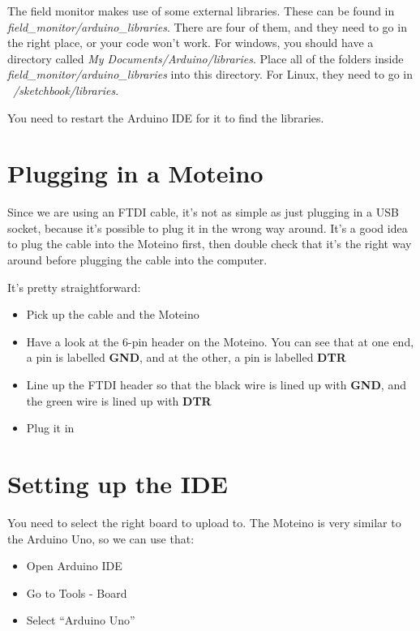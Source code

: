\documentclass[10pt]{article}
\begin{document}
The field monitor makes use of some external libraries. These can be found in \textit{field\_monitor/arduino\_libraries}. There are four of them, and they need to go in the right place, or your code won't work. For windows, you should have a directory called \textit{My Documents/Arduino/libraries}. Place all of the folders inside \textit{field\_monitor/arduino\_libraries} into this directory. For Linux, they need to go in \textit{~/sketchbook/libraries}. 

You need to restart the Arduino IDE for it to find the libraries.

\section{Plugging in a Moteino}

Since we are using an FTDI cable, it's not as simple as just plugging in a USB socket, because it's possible to plug it in the wrong way around. It's a good idea to plug the cable into the Moteino first, then double check that it's the right way around before plugging the cable into the computer.

It's pretty straightforward:

\begin{itemize}
 \item Pick up the cable and the Moteino
 \item Have a look at the 6-pin header on the Moteino. You can see that at one end, a pin is labelled \textbf{GND}, and at the other, a pin is labelled \textbf{DTR}
 \item Line up the FTDI header so that the black wire is lined up with \textbf{GND}, and the green wire is lined up with \textbf{DTR}
 \item Plug it in
\end{itemize}

\section{Setting up the IDE}

You need to select the right board to upload to. The Moteino is very similar to the Arduino Uno, so we can use that:

\begin{itemize}
 \item Open Arduino IDE 
 \item Go to Tools - Board
 \item Select ``Arduino Uno''
\end{itemize}
\end{document}
